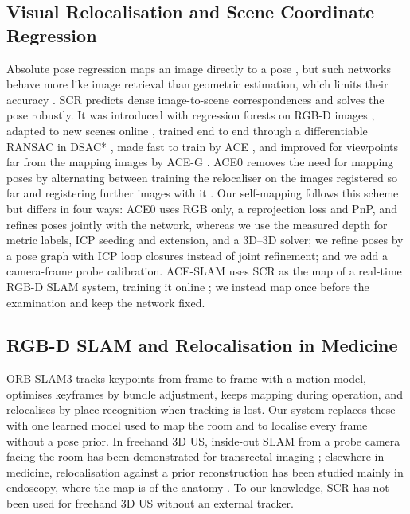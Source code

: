 \documentclass[journal]{IEEEtran}
\begin{document}
\subsection{Visual Relocalisation and Scene Coordinate Regression}
Absolute pose regression maps an image directly to a pose \cite{TODO-posenet}, but such networks behave more like image retrieval than geometric estimation, which limits their accuracy \cite{sattler2019}. SCR predicts dense image-to-scene correspondences and solves the pose robustly. It was introduced with regression forests on RGB-D images \cite{shotton2013}, adapted to new scenes online \cite{cavallari2017onthefly,cavallari2019online}, trained end to end through a differentiable RANSAC in DSAC* \cite{brachmann2022dsac}, made fast to train by ACE \cite{brachmann2023ace}, and improved for viewpoints far from the mapping images by ACE-G \cite{bruns2025aceg}. ACE0 removes the need for mapping poses by alternating between training the relocaliser on the images registered so far and registering further images with it \cite{brachmann2024ace0}. Our self-mapping follows this scheme but differs in four ways: ACE0 uses RGB only, a reprojection loss and PnP, and refines poses jointly with the network, whereas we use the measured depth for metric labels, ICP seeding and extension, and a 3D--3D solver; we refine poses by a pose graph with ICP loop closures instead of joint refinement; and we add a camera-frame probe calibration. ACE-SLAM uses SCR as the map of a real-time RGB-D SLAM system, training it online \cite{alzugaray2025aceslam}; we instead map once before the examination and keep the network fixed.

\subsection{RGB-D SLAM and Relocalisation in Medicine}
ORB-SLAM3 \cite{campos2021orbslam3} tracks keypoints from frame to frame with a motion model, optimises keyframes by bundle adjustment, keeps mapping during operation, and relocalises by place recognition when tracking is lost. Our system replaces these with one learned model used to map the room and to localise every frame without a pose prior. In freehand 3D US, inside-out SLAM from a probe camera facing the room has been demonstrated for transrectal imaging \cite{busam2018insideout}; elsewhere in medicine, relocalisation against a prior reconstruction has been studied mainly in endoscopy, where the map is of the anatomy \cite{TODO-endoscopic-relocalisation}. To our knowledge, SCR has not been used for freehand 3D US without an external tracker.
\end{document}
